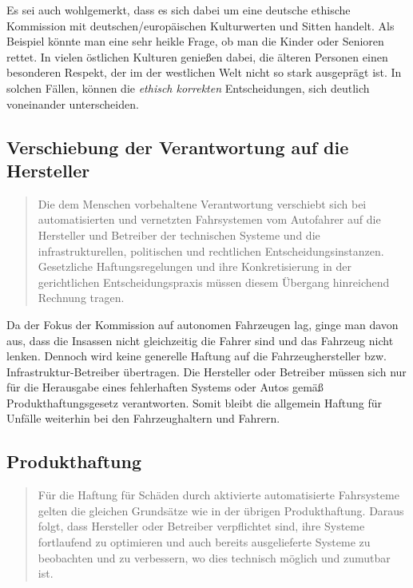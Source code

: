 \documentclass[twoside,a4paper,12pt]{article}
\begin{document}
Es sei auch wohlgemerkt, dass es sich dabei um eine deutsche ethische Kommission mit deutschen/europäischen Kulturwerten und Sitten handelt. Als Beispiel könnte man eine sehr heikle Frage, ob man die Kinder oder Senioren rettet. In vielen östlichen Kulturen genießen dabei, die älteren Personen einen besonderen Respekt, der im der westlichen Welt nicht so stark ausgeprägt ist. In solchen Fällen, können die \textit{ethisch korrekten} Entscheidungen, sich deutlich voneinander unterscheiden.


\subsection{Verschiebung der Verantwortung auf die Hersteller} \label{VerschiebungDerVerantwortungAufDieHersteller}
\begin{quote}
\glqq
Die dem Menschen vorbehaltene Verantwortung verschiebt sich bei automatisierten und
vernetzten Fahrsystemen vom Autofahrer auf die Hersteller und Betreiber der technischen Systeme und die infrastrukturellen, 
politischen und rechtlichen Entscheidungsinstanzen. Gesetzliche Haftungsregelungen und ihre Konkretisierung in der gerichtlichen
Entscheidungspraxis müssen diesem Übergang hinreichend Rechnung tragen.\grqq\mbox{~\cite[S. 11]{ek}}
\end{quote}
Da der Fokus der Kommission auf autonomen Fahrzeugen lag, ginge man davon aus, dass die Insassen nicht gleichzeitig die Fahrer sind und das Fahrzeug nicht lenken. Dennoch wird keine generelle Haftung auf die Fahrzeughersteller bzw. Infrastruktur-Betreiber übertragen. Die Hersteller oder Betreiber müssen sich nur für die Herausgabe eines fehlerhaften Systems oder Autos gemäß Produkthaftungsgesetz verantworten. Somit bleibt die allgemein Haftung für Unfälle weiterhin bei den Fahrzeughaltern und Fahrern.

\subsection{Produkthaftung} \label{Produkthaftung}

\begin{quote}
\glqq
Für die Haftung für Schäden durch aktivierte automatisierte Fahrsysteme gelten die gleichen Grundsätze wie in der übrigen 
Produkthaftung. Daraus folgt, dass Hersteller oder
Betreiber verpflichtet sind, ihre Systeme fortlaufend zu optimieren und auch bereits ausgelieferte Systeme zu beobachten und zu 
verbessern, wo dies technisch möglich und zumutbar ist.\grqq\mbox{~\cite[S. 12]{ek}}
\end{quote}
\end{document}
